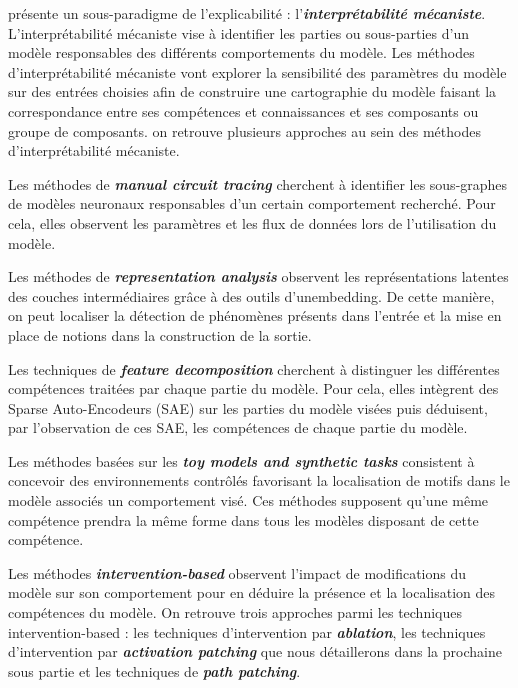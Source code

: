         \cite{somvanshi_bridging_2026} présente un sous-paradigme de l'explicabilité : l'\textbf{\textit{interprétabilité mécaniste}}. L'interprétabilité mécaniste vise à identifier les parties ou sous-parties d'un modèle responsables des différents comportements du modèle. Les méthodes d'interprétabilité mécaniste vont explorer la sensibilité des paramètres du modèle sur des entrées choisies afin de construire une cartographie du modèle faisant la correspondance entre ses compétences et connaissances et ses composants ou groupe de composants. on retrouve plusieurs approches au sein des méthodes d'interprétabilité mécaniste.

        Les méthodes de \textbf{\textit{manual circuit tracing}} cherchent à identifier les sous-graphes de modèles neuronaux responsables d'un certain comportement recherché. Pour cela, elles observent les paramètres et les flux de données lors de l'utilisation du modèle.

        Les méthodes de \textbf{\textit{representation analysis}} observent les représentations latentes des couches intermédiaires grâce à des outils d'unembedding. De cette manière, on peut localiser la détection de phénomènes présents dans l'entrée et la mise en place de notions dans la construction de la sortie.

        Les techniques de \textbf{\textit{feature decomposition}} cherchent à distinguer les différentes compétences traitées par chaque partie du modèle. Pour cela, elles intègrent des Sparse Auto-Encodeurs (SAE) sur les parties du modèle visées puis déduisent, par l'observation de ces SAE, les compétences de chaque partie du modèle.

        Les méthodes basées sur les \textbf{\textit{toy models and synthetic tasks}} consistent à concevoir des environnements contrôlés favorisant la localisation de motifs dans le modèle associés un comportement visé. Ces méthodes supposent qu'une même compétence prendra la même forme dans tous les modèles disposant de cette compétence.

        Les méthodes \textbf{\textit{intervention-based}} observent l'impact de modifications du modèle sur son comportement pour en déduire la présence et la localisation des compétences du modèle. On retrouve trois approches parmi les techniques intervention-based : les techniques d'intervention par \textbf{\textit{ablation}}, les techniques d'intervention par \textbf{\textit{activation patching}} que nous détaillerons dans la prochaine sous partie et les techniques de \textbf{\textit{path patching}}. 


